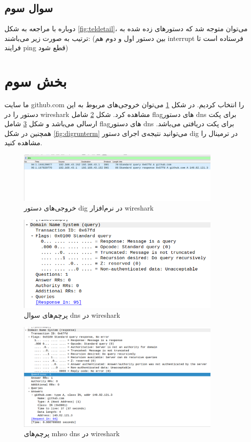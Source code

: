 \documentclass{article}
\begin{document}
\subsection{سوال سوم}
دوباره با مراجعه به شکل  \ref{fig:teldetail}، می‌توان متوجه شد که دستور‌های زده شده به ترتیب به صورت زیر می‌باشند: (بین دستور اول و دوم هم interrupt فرستاده است تا فرایند ping قطع شود)
\begin{flushleft}
\end{flushleft}
\section{بخش سوم}
ما سایت github.com را انتخاب کردیم. در شکل \ref{fig:digout} می‌توان خروجی‌های مربوط به این دستور را در wireshark مشاهده کرد. شکل \ref{fig:flagsquery} شامل flagهای دستور dns برای پکت ارسالی می‌باشد و شکل \ref{fig:flagsresp} شامل flagهای دستور dns برای پکت دریافتی می‌باشد. همچنین در شکل \ref{fig:digrunterm} می‌توانید نتیجه‌ی اجرای دستور dig در ترمینال را مشاهده کنید.
\begin{figure}[h!]
	\centering
	\includegraphics[width=0.9\textwidth]{src/digrun.png}
	\caption{
		خروجی‌های دستور dig در نرم‌افزار wireshark
	}
	\label{fig:digout}
\end{figure}
\begin{figure}[h!]
	\centering
	\includegraphics[width=0.9\textwidth]{src/flagsquery.png}
	\caption{
		پرچم‌های سوال dns در wireshark
	}
	\label{fig:flagsquery}
\end{figure}
\begin{figure}[h!]
	\centering
	\includegraphics[width=0.9\textwidth]{src/flagsresp.png}
	\caption{
		پرچم‌های mhso dns در wireshark
	}
	\label{fig:flagsresp}
\end{figure}
\end{document}
